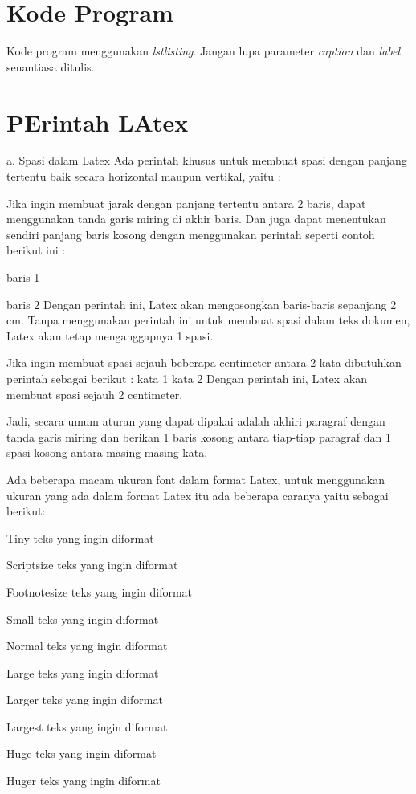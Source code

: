 \section{Kode Program}
Kode program menggunakan \textit{lstlisting}. Jangan lupa parameter \textit{caption} dan \textit{label} senantiasa ditulis.


\section {PErintah LAtex}
a. Spasi dalam Latex
Ada perintah khusus untuk membuat spasi dengan panjang tertentu baik secara horizontal maupun vertikal, yaitu :

Jika ingin membuat jarak dengan panjang tertentu antara 2 baris, dapat menggunakan tanda garis miring di akhir baris. Dan juga dapat menentukan sendiri panjang baris kosong dengan menggunakan perintah seperti contoh berikut ini :

baris 1

\vspace{2cm}

baris 2 
Dengan perintah ini, Latex akan mengosongkan baris-baris sepanjang 2 cm. Tanpa menggunakan perintah ini untuk membuat spasi dalam teks dokumen, Latex akan tetap menganggapnya 1 spasi.

Jika ingin membuat spasi sejauh beberapa centimeter antara 2 kata dibutuhkan perintah sebagai berikut :
kata 1 \hspace{2cm} kata 2
Dengan perintah ini, Latex akan membuat spasi sejauh 2 centimeter.

Jadi, secara umum aturan yang dapat dipakai adalah akhiri paragraf dengan tanda garis miring dan berikan 1 baris kosong antara tiap-tiap paragraf dan 1 spasi kosong antara masing-masing kata.

Ada beberapa macam ukuran font dalam format Latex, untuk menggunakan ukuran yang ada dalam format Latex itu ada beberapa caranya yaitu sebagai berikut:

Tiny
{\tiny teks yang ingin diformat }

Scriptsize
{\scriptsize teks yang ingin diformat }

Footnotesize
{\footnotesize teks yang ingin diformat }

Small
{\small teks yang ingin diformat }

Normal
{\normalsize teks yang ingin diformat }

Large
{\large teks yang ingin diformat }

Larger
{\Large teks yang ingin diformat }

Largest
{\LARGE teks yang ingin diformat }

Huge
{\huge teks yang ingin diformat }

Huger
{\Huge teks yang ingin diformat }

